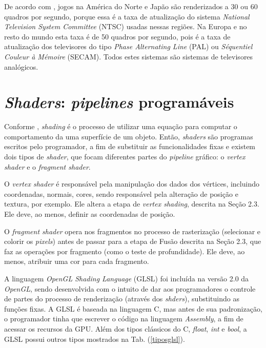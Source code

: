 	De acordo com \cite{framerate2009}, jogos na América do Norte e Japão são renderizados a 30 ou 60 quadros por segundo, porque essa é a taxa de atualização do sistema \textit{National Television System Committee} (NTSC) usadas nessas regiões. Na Europa e no resto do mundo esta taxa é de 50 quadros por segundo, pois é a taxa de atualização dos televisores do tipo \textit{Phase Alternating Line} (PAL) ou \textit{Séquentiel Couleur à Mémoire} (SECAM). Todos estes sistemas são sistemas de televisores analógicos.

\section{\textit{Shaders}: \textit{pipelines} programáveis}
	
	Conforme \cite{realtime}, \textit{shading} é o processo de utilizar uma equação para computar o comportamento da uma superfície de um objeto. Então, \textit{shaders} são programas escritos pelo programador, a fim de substituir as funcionalidades fixas e existem dois tipos de \textit{shader}, que focam diferentes partes do \textit{pipeline} gráfico: o \textit{vertex shader} e o \textit{fragment shader}. 

	O   \textit{vertex shader} é responsável pela manipulação dos dados dos vértices, incluindo coordenadas, normais, cores, sendo responsável pela alteração de posição e textura, por exemplo. Ele altera a etapa de \textit{vertex shading}, descrita na Seção 2.3. Ele deve, ao menos, definir as coordenadas de posição. 

	O \textit{fragment shader} opera nos fragmentos no processo de rasterização (selecionar e colorir os \textit{pixels}) antes de passar para a etapa de Fusão descrita na Seção 2.3, que faz as operações por fragmento (como o teste de profundidade). Ele deve, ao menos, atribuir uma cor para cada fragmento. 

	A linguagem  \textit{OpenGL Shading Language} (GLSL) foi incluída na versão 2.0 da  \textit{OpenGL}, sendo desenvolvida com o intuito de dar aos programadores o controle de partes do processo de renderização (através dos \textit{shders}), substituindo as funções fixas. A GLSL é baseada na linguagem C, mas antes de sua padronização, o programador tinha que escrever o código na linguagem \textit{Assembly}, a fim de acessar os recursos da GPU. Além dos tipos clássicos do C, \textit{float}, \textit{int} e \textit{bool}, a GLSL possui outros tipos mostrados na Tab. (\ref{tiposglsl}).

